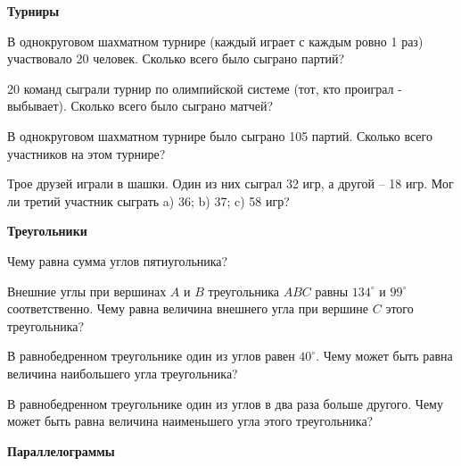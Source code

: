 \documentclass{article}
\begin{document}
    \begin{center}
        \textbf{Турниры}
    \end{center}

    \begin{enumerate_boxed}

        \item В однокруговом шахматном турнире (каждый играет с каждым ровно 1 раз) участвовало 20 человек.
        Сколько всего было сыграно партий?

        \item 20 команд сыграли турнир по олимпийской системе (тот, кто проиграл - выбывает).
        Сколько всего было сыграно матчей?

        \item В однокруговом шахматном турнире было сыграно 105 партий.
        Сколько всего участников на этом турнире?

        \item Трое друзей играли в шашки.
        Один из них сыграл 32 игр, а другой – 18 игр.
        Мог ли третий участник сыграть a) 36; b) 37; c) 58 игр?

    \end{enumerate_boxed}


    \begin{center}
        \textbf{Треугольники}
    \end{center}

    \begin{enumerate_boxed}

        \item Чему равна сумма углов пятиугольника?

        \item Внешние углы при вершинах $A$ и $B$ треугольника $ABC$ равны $134^\circ$ и $99^\circ$ соответственно.
        Чему равна величина внешнего угла при вершине $C$ этого треугольника?

        \item В равнобедренном треугольнике один из углов равен $40^\circ$.
        Чему может быть равна величина наибольшего угла треугольника?

        \item В равнобедренном треугольнике один из углов в два раза больше другого.
        Чему может быть равна величина наименьшего угла этого треугольника?

    \end{enumerate_boxed}

    \begin{center}
        \textbf{Параллелограммы}
    \end{center}
\end{document}
